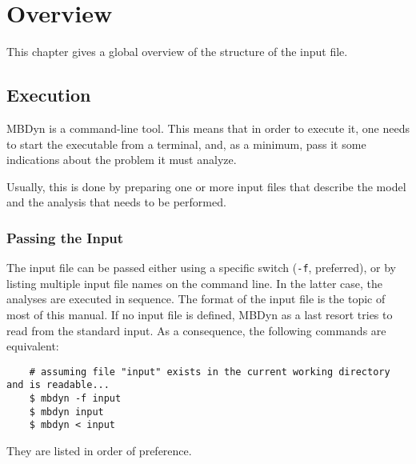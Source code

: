 %
%
%
%
%
%
%
%

\chapter{Overview}\label{sec:OVERVIEW}
This chapter gives a global overview of the structure of the input file.


\section{Execution}
MBDyn is a command-line tool.
This means that in order to execute it, one needs to start the executable
from a terminal, and, as a minimum, pass it some indications about the problem
it must analyze.

Usually, this is done by preparing one or more input files that describe
the model and the analysis that needs to be performed.

\subsection{Passing the Input}
The input file can be passed either using a specific switch
(\texttt{-f}, preferred),
or by listing multiple input file names on the command line.
In the latter case, the analyses are executed in sequence.
The format of the input file is the topic of most of this manual.
If no input file is defined, MBDyn as a last resort tries to read
from the standard input.
As a consequence, the following commands are equivalent:
\begin{verbatim}
    # assuming file "input" exists in the current working directory and is readable...
    $ mbdyn -f input
    $ mbdyn input
    $ mbdyn < input
\end{verbatim}
They are listed in order of preference.

